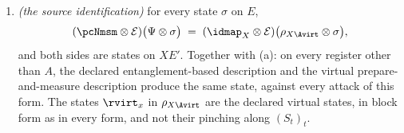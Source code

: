 \begin{theorem}
\begin{enumerate}[label=(\roman*),leftmargin=2.2em]
\begin{enumerate}[label=(\alph*),leftmargin=2.2em]
$\Psi\otimes\sigma$ for every state $\sigma$ on $E$: Alice's measurement may
be performed before the attack or after it, indifferently. This uses no
property of the certificate, only that the two maps act on complementary
registers;
\item \emph{(the source identification)} for every state $\sigma$ on $E$,
\begin{equation}\label{eq:srident}
  (\pcNmsm\otimes\mathcal{E})\big(\Psi\otimes\sigma\big)
  \;=\;(\idmap_{X}\otimes\mathcal{E})\big(\rho_{X\Avirt}\otimes\sigma\big) ,
\end{equation}
and both sides are states on $XE'$. Together with (a): on every register
other than $A$, the declared entanglement-based description and the
virtual prepare-and-measure description produce the same state, against
every attack of this form. The states $\rvirt_x$ in $\rho_{X\Avirt}$ are the
declared virtual states, in block form as in every form, and not their
pinching along $(S_t)_t$.
\end{enumerate}
\end{enumerate}
\end{theorem}

